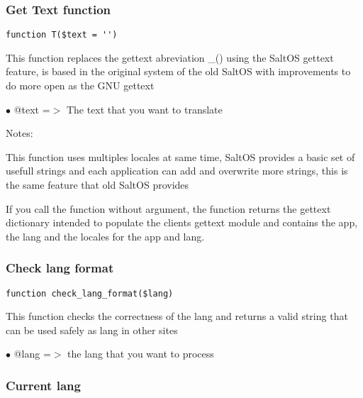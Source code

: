 \documentclass[a4paper]{article}
\begin{document}
\subsubsection{Get Text function}

\begin{lstlisting}
function T($text = '')
\end{lstlisting}

This function replaces the gettext abreviation \_() using the SaltOS gettext
feature, is based in the original system of the old SaltOS with improvements
to do more open as the GNU gettext

\begin{compactitem}
\item[\color{myblue}$\bullet$] @text =$>$ The text that you want to translate
\end{compactitem}

Notes:

This function uses multiples locales at same time, SaltOS provides a basic set of
usefull strings and each application can add and overwrite more strings, this is
the same feature that old SaltOS provides

If you call the function without argument, the function returns the gettext
dictionary intended to populate the clients gettext module and contains the
app, the lang and the locales for the app and lang.

\hypertarget{toc151}{}
\subsubsection{Check lang format}

\begin{lstlisting}
function check_lang_format($lang)
\end{lstlisting}

This function checks the correctness of the lang and returns a valid
string that can be used safely as lang in other sites

\begin{compactitem}
\item[\color{myblue}$\bullet$] @lang =$>$ the lang that you want to process
\end{compactitem}

\hypertarget{toc152}{}
\subsubsection{Current lang}
\end{document}
